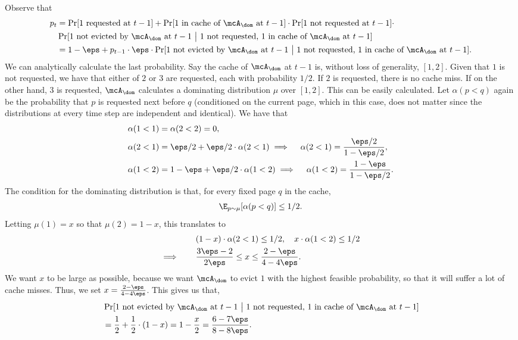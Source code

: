 \documentclass[11pt]{article}
\begin{document}
Observe that 
\begin{align*}
    p_t &= \Pr[\text{$1$ requested at $t-1$}] + \Pr[\text{$1$ in cache of $\mcA_\dom$ at $t-1$}] \cdot \Pr[\text{$1$ not requested at $t-1$}] \cdot \\
    &\Pr[\text{$1$ not evicted by $\mcA_\dom$ at $t-1 ~\big|$ $1$ not requested, $1$ in cache of $\mcA_\dom$ at $t-1$}] \\
    &= 1-\eps + p_{t-1} \cdot \eps \cdot \Pr[\text{$1$ not evicted by $\mcA_\dom$ at $t-1 ~\big|$ $1$ not requested, $1$ in cache of $\mcA_\dom$ at $t-1$}].
\end{align*}
We can analytically calculate the last probability. Say the cache of $\mcA_\dom$ at $t-1$ is, without loss of generality, $[1,2]$. Given that $1$ is not requested, we have that either of $2$ or $3$ are requested, each with probability $1/2$. If $2$ is requested, there is no cache miss. If on the other hand, $3$ is requested, $\mcA_\dom$ calculates a dominating distribution $\mu$ over $[1,2]$. This can be easily calculated. Let $\alpha(p<q)$ again be the probability that $p$ is requested next before $q$ (conditioned on the current page, which in this case, does not matter since the distributions at every time step are independent and identical). We have that
\begin{align*}
    &\alpha(1<1) = \alpha(2<2) = 0, \\
    &\alpha(2<1) = \eps/2 + \eps/2 \cdot \alpha(2<1)
    \implies \quad \alpha(2<1) = \frac{\eps/2}{1-\eps/2}, \\
    &\alpha(1<2) = 1-\eps + \eps/2 \cdot \alpha(1<2)
    \implies \quad \alpha(1<2) = \frac{1-\eps}{1-\eps/2}. 
\end{align*}
The condition for the dominating distribution is that, for every fixed page $q$ in the cache,
\begin{align*}
    \E_{p \sim \mu}[\alpha(p<q)] \le 1/2.
\end{align*}
Letting $\mu(1)=x$ so that $\mu(2)=1-x$, this translates to
\begin{align*}
    &(1-x)\cdot \alpha(2<1) \le 1/2, \quad x\cdot \alpha(1<2) \le 1/2 \\
    \implies \qquad& \frac{3\eps-2}{2\eps} \le x \le \frac{2-\eps}{4-4\eps}.
\end{align*}
We want $x$ to be large as possible, because we want $\mcA_\dom$ to evict $1$ with the highest feasible probability, so that it will suffer a lot of cache misses. Thus, we set $x = \frac{2-\eps}{4-4\eps}$. This gives us that,
\begin{align*}
    &\Pr[\text{$1$ not evicted by $\mcA_\dom$ at $t-1 ~\big|$ $1$ not requested, $1$ in cache of $\mcA_\dom$ at $t-1$}] \\
    &= \frac12 + \frac{1}{2} \cdot (1-x) = 1-\frac{x}{2} = \frac{6-7\eps}{8-8\eps}.
\end{align*}
\end{document}
